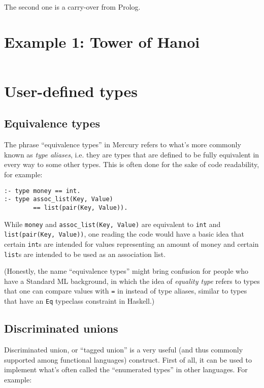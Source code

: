 The second one is a carry-over from Prolog.

\section{Example 1: Tower of Hanoi}

\begin{lstlisting}[language=Mercury]

\end{lstlisting}

\section{User-defined types}

\subsection{Equivalence types}

The phrase ``equivalence types'' in Mercury refers to what's more commonly known as \textit{type aliases}, i.e. they are types that are defined to be fully equivalent in every way to some other types. This is often done for the sake of code readability, for example:

\begin{lstlisting}[language=Mercury]
:- type money == int.
:- type assoc_list(Key, Value)
        == list(pair(Key, Value)).
\end{lstlisting}

While \texttt{money} and \texttt{assoc\_list(Key, Value)} are equivalent to \texttt{int} and \texttt{list(pair(Key, Value))}, one reading the code would have a basic idea that certain \texttt{int}s are intended for values representing an amount of money and certain \texttt{list}s are intended to be used as an association list. 

(Honestly, the name ``equivalence types'' might bring confusion for people who have a Standard ML background, in which the idea of \textit{equality type} refers to types that one can compare values with \texttt{=} in instead of type aliases, similar to types that have an \texttt{Eq} typeclass constraint in Haskell.)

\subsection{Discriminated unions}

Discriminated union, or ``tagged union'' is a very useful (and thus commonly supported among functional languages) construct. First of all, it can be used to implement what's often called the ``enumerated types'' in other languages. For example:

